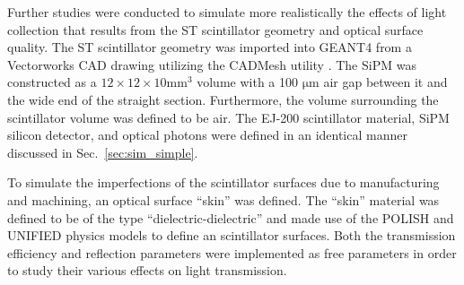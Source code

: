 Further studies were conducted to simulate more realistically the effects of light collection that results from the ST scintillator geometry and optical surface quality.  The ST scintillator geometry was imported into GEANT4 from a Vectorworks CAD drawing utilizing the CADMesh utility \cite{cadmesh_g4}. %
The SiPM was constructed as a $12 \times 12 \times 10 \mathrm{mm^{3}}$ volume with a 100 $\mathrm{\mu m}$ air gap between it and the wide end of the straight section.  Furthermore, the volume surrounding the scintillator volume was defined to be air.  The EJ-200 scintillator material, SiPM silicon detector, and optical photons were defined in an identical manner discussed in Sec.~\ref{sec:sim_simple}.

To simulate the imperfections of the scintillator surfaces due to manufacturing and machining, an optical surface ``skin'' was defined.  The ``skin'' material was defined to be of the type ``dielectric-dielectric'' and made use of the POLISH and UNIFIED physics models \cite{scint_surface_sim} to define an scintillator surfaces.  Both the transmission efficiency and reflection parameters were implemented as free parameters in order to study their various effects on light transmission.

